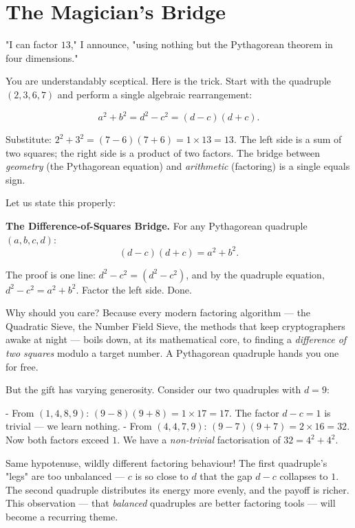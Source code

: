 \bigskip

\section*{The Magician's Bridge}

"I can factor $13$," I announce, "using nothing but the Pythagorean theorem in four dimensions."

You are understandably sceptical. Here is the trick. Start with the quadruple $(2, 3, 6, 7)$ and perform a single algebraic rearrangement:

\[
a^2 + b^2 = d^2 - c^2 = (d - c)(d + c).
\]

Substitute: $2^2 + 3^2 = (7 - 6)(7 + 6) = 1 \times 13 = 13$. The left side is a sum of two squares; the right side is a product of two factors. The bridge between \textit{geometry} (the Pythagorean equation) and \textit{arithmetic} (factoring) is a single equals sign.

Let us state this properly:


\begin{displayquote}
\textbf{The Difference-of-Squares Bridge.} For any Pythagorean quadruple $(a, b, c, d)$:
$$(d - c)(d + c) = a^2 + b^2.$$
\end{displayquote}


The proof is one line: $d^2 - c^2 = (d^2 - c^2)$, and by the quadruple equation, $d^2 - c^2 = a^2 + b^2$. Factor the left side. Done.

Why should you care? Because every modern factoring algorithm --- the Quadratic Sieve, the Number Field Sieve, the methods that keep cryptographers awake at night --- boils down, at its mathematical core, to finding a \textit{difference of two squares} modulo a target number. A Pythagorean quadruple hands you one for free.

But the gift has varying generosity. Consider our two quadruples with $d = 9$:

- From $(1, 4, 8, 9)$: $(9 - 8)(9 + 8) = 1 \times 17 = 17$. The factor $d - c = 1$ is trivial --- we learn nothing.
- From $(4, 4, 7, 9)$: $(9 - 7)(9 + 7) = 2 \times 16 = 32$. Now both factors exceed $1$. We have a \textit{non-trivial} factorisation of $32 = 4^2 + 4^2$.

Same hypotenuse, wildly different factoring behaviour! The first quadruple's "legs" are too unbalanced --- $c$ is so close to $d$ that the gap $d - c$ collapses to $1$. The second quadruple distributes its energy more evenly, and the payoff is richer. This observation --- that \textit{balanced} quadruples are better factoring tools --- will become a recurring theme.


